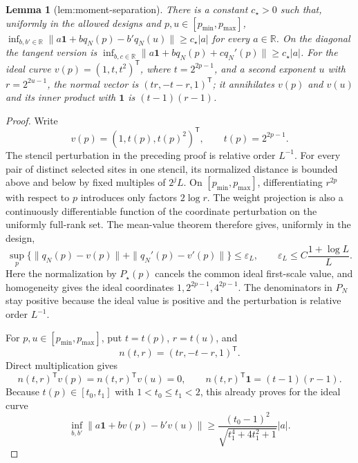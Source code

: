 \documentclass{article}
\newtheorem{lemma}{Lemma}
\begin{document}
\begin{lemma}[lem:moment-separation]\label{lem:moment-separation}
There is a constant \(c_{\star}>0\) such that, uniformly in the allowed designs and \(p,u\in[p_{\min},p_{\max}]\), \(\inf_{b,b'\in\mathbb R}\|a\mathbf 1+bq_N(p)-b'q_N(u)\|\ge c_{\star}|a|\) for every \(a\in\mathbb R\). On the diagonal the tangent version is \(\inf_{b,c\in\mathbb R}\|a\mathbf1+bq_N(p)+cq_N'(p)\|\ge c_{\star}|a|\). For the ideal curve \(v(p)=(1,t,t^2)^{\mathsf T}\), where \(t=2^{2p-1}\), and a second exponent \(u\) with \(r=2^{2u-1}\), the normal vector is \((tr,-t-r,1)^{\mathsf T}\); it annihilates \(v(p)\) and \(v(u)\) and its inner product with \(\mathbf1\) is \((t-1)(r-1)\).
\end{lemma}
\begin{proof}
Write
\[
 v(p)=(1,t(p),t(p)^2)^{\mathsf T},
 \qquad t(p)=2^{2p-1}.
\]
The stencil perturbation in the preceding proof is relative order \(L^{-1}\).  For every pair of distinct selected sites in one stencil, its normalized distance is bounded above and below by fixed multiples of \(2^jL\).  On \([p_{\min},p_{\max}]\), differentiating \(r^{2p}\) with respect to \(p\) introduces only factors \(2\log r\).  The weight projection is also a continuously differentiable function of the coordinate perturbation on the uniformly full-rank set.  The mean-value theorem therefore gives, uniformly in the design,
\[
 \sup_p\bigl\{\|q_N(p)-v(p)\|+\|q_N'(p)-v'(p)\|\bigr\}
 \le \varepsilon_L,
 \qquad
 \varepsilon_L\le C\frac{1+\log L}{L}.
\]
Here the normalization by \(P_\star(p)\) cancels the common ideal first-scale value, and homogeneity gives the ideal coordinates \(1,2^{2p-1},4^{2p-1}\).  The denominators in \(P_N\) stay positive because the ideal value is positive and the perturbation is relative order \(L^{-1}\).

For \(p,u\in[p_{\min},p_{\max}]\), put \(t=t(p)\), \(r=t(u)\), and
\[
 n(t,r)=(tr,-t-r,1)^{\mathsf T}.
\]
Direct multiplication gives
\[
 n(t,r)^{\mathsf T}v(p)=n(t,r)^{\mathsf T}v(u)=0,
 \qquad
 n(t,r)^{\mathsf T}\mathbf 1=(t-1)(r-1).
\]
Because \(t(p)\in[t_0,t_1]\) with \(1<t_0\le t_1<2\), this already proves for the ideal curve
\[
 \inf_{b,b'}\|a\mathbf 1+bv(p)-b'v(u)\|
 \ge
 \frac{(t_0-1)^2}{\sqrt{t_1^4+4t_1^2+1}}|a|.
\]


\end{proof}
\end{document}
